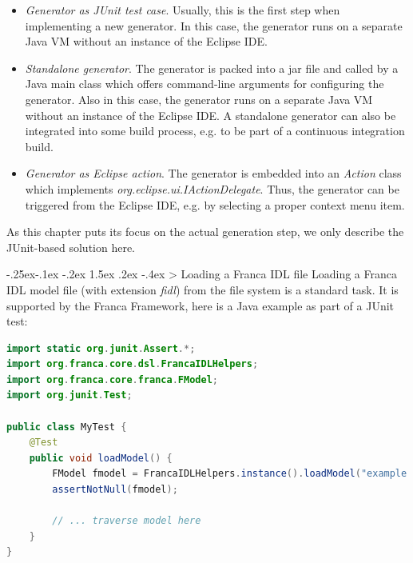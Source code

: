 \documentclass[a4paper,10pt]{scrreprt}
\makeatletter
\renewcommand\subsection{\medskip\@startsection{subsection}{2}{\z@}%
  {-.25ex\@plus -.1ex \@minus -.2ex}%
  {1.5ex \@plus .2ex \@minus -.4ex}%
  {\ifnum \scr@compatibility>\@nameuse{scr@v@2.96}\relax
    \setlength{\parfillskip}{\z@ plus 1fil}\fi
    \raggedsection\normalfont\sectfont\nobreak\size@subsection
  }%
}
\newlength{\XdocItemIndent}
\makeatother
\begin{document}
\setlength{\XdocItemIndent}{\textwidth}
\begin{itemize}
\addtolength{\XdocItemIndent}{-2.5em}
\item \begin{minipage}[t]{\XdocItemIndent}
\textit{Generator as JUnit test case}. Usually, this is the first step
	     when implementing a new generator. In this case, the generator
	     runs on a separate Java VM without an instance of the Eclipse IDE.

\end{minipage}
\item \begin{minipage}[t]{\XdocItemIndent}
\textit{Standalone generator}. The generator is packed into a jar file
	     and called by a Java main class which offers command-line arguments
	     for configuring the generator. Also in this case, the generator
	     runs on a separate Java VM without an instance of the Eclipse IDE.
	     A standalone generator can also be integrated into some build process,
	     e.g. to be part of a continuous integration build.

\end{minipage}
\item \begin{minipage}[t]{\XdocItemIndent}
\textit{Generator as Eclipse action}. The generator is embedded into
	     an \textit{Action} class which implements \textit{org.eclipse.ui.IActionDelegate}.
	     Thus, the generator can be triggered from the Eclipse IDE, e.g. by 
	     selecting a proper context menu item.

\end{minipage}
\end{itemize}
\addtolength{\XdocItemIndent}{2.5em}

As this chapter puts its focus on the actual generation step, we only 
describe the JUnit-based solution here. 

\subsection{Loading a Franca IDL file}
\label{BuildingGenerators_Introduction_LoadingFrancaFile}
Loading a Franca IDL model file (with extension \textit{fidl}) from the file system is
a standard task. It is supported by the Franca Framework, here is a Java example
as part of a JUnit test:


\begin{lstlisting}[language=Java]
import static org.junit.Assert.*;
import org.franca.core.dsl.FrancaIDLHelpers;
import org.franca.core.franca.FModel;
import org.junit.Test;

public class MyTest {
	@Test
	public void loadModel() {
		FModel fmodel = FrancaIDLHelpers.instance().loadModel("example.fidl");
		assertNotNull(fmodel);

		// ... traverse model here
	}
}
\end{lstlisting}
\end{document}
